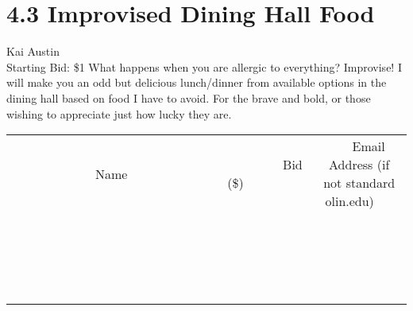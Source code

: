 \documentclass[11pt]{article}
\begin{document}
\section*{4.3 Improvised Dining Hall Food}
Kai Austin
\\
Starting Bid: \$1
\newline
What happens when you are allergic to everything?
Improvise!
I will make you an odd but delicious lunch/dinner from available options in the dining hall based on food I have to avoid. For the brave and bold, or those wishing to appreciate just how lucky they are.
\\[3ex]
\begin{tabular}{c c c}
~~~~~~~~~~~~~Name~~~~~~~~~~~~~ & ~~~~~~~~~Bid (\$)~~~~~~~~~  & ~~~Email Address (if not standard olin.edu)~~~\\
 & & \\
\hline
 & & \\
\hline
 & & \\
\hline
 & & \\
\hline
 & & \\
\hline
 & & \\
\hline
 & & \\
\hline
 & & \\
\hline
 & & \\
\hline
 & & \\
\hline
 & & \\
\hline
 & & \\
\hline
 & & \\
\hline
 & & \\
\hline
 & & \\
\hline
 & & \\
\hline
 & & \\
\hline
 & & \\
\hline
 & & \\
\hline
\end{tabular}
\newpage
\end{document}
